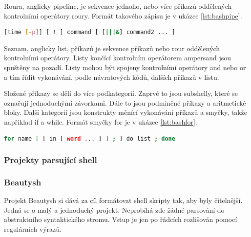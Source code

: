 \documentclass[thesis=M,czech]{FITthesis}[2012/06/26]
\begin{document}
Roura, anglicky pipeline, je sekvence jednoho, nebo více příkazů oddělených kontrolními operátory roury. Formát takového zápisu je v ukázce \ref{lst:bashpipe}.

\begin{minipage}{\linewidth}
\begin{lstlisting}[language=bash, caption={Formát roury v Bashi}, label={lst:bashpipe}]
[time [-p]] [ ! ] command [ [|||&] command2 ... ]
\end{lstlisting}
\end{minipage}

Seznam, anglicky list, 	příkazů je sekvence příkazů nebo rour oddělených kontrolními operátory. Listy končící kontrolním operátorem ampersand jsou spuštěny na pozadí. Listy mohou být spojeny kontrolními operátory and nebo or a tím řídit vykonávání, podle návratových kódů, dalších příkazů v listu.

Složené příkazy se dělí do více podkategorií. Zaprvé to jsou subshelly, které se označují jednoduchými závorkami. Dále to jsou podmíněné příkazy a aritmetické bloky. Další kategorií jsou konstrukty měnící vykonávání příkazů a smyčky, takže například if a while. Formát smyčky for je v ukázce \ref{lst:bashfor}.

\begin{minipage}{\linewidth}
\begin{lstlisting}[language=bash, caption={Formát jedné varianty cyklu for v Bashi}, label={lst:bashfor}]
for name [ [ in [ word ... ] ] ; ] do list ; done
\end{lstlisting}
\end{minipage}




\subsubsection{Projekty parsující shell}

%
\subsubsection{Beautysh}

Projekt Beautysh si dává za cíl formátovat shell skripty tak, aby byly čitelnější. Jedná se o malý a jednoduchý projekt. Neprobíhá zde žádné parsování do abstraktního syntaktického stromu. Vstup je jen po řádcích rozlišován pomocí regulárních výrazů.
\end{document}
